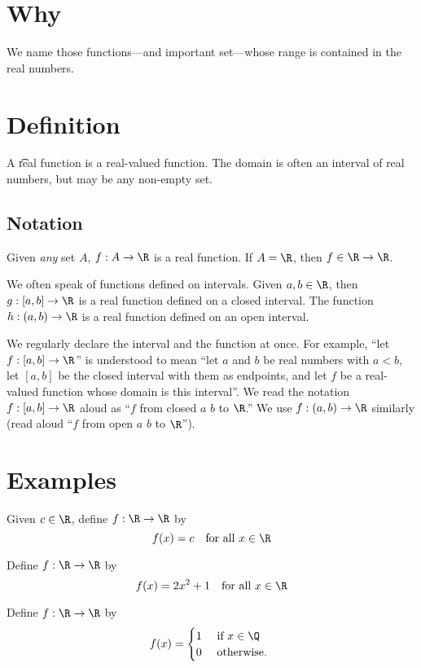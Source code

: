 
\section*{Why}

We name those functions---and important set---whose range is contained in the real numbers.

\section*{Definition}

A \t{real function} is a real-valued function.
The domain is often an interval of real numbers, but may be any non-empty set.

\subsection*{Notation}

Given \textit{any} set $A$, $f: A \to \R $ is a real function.
If $A = \R $, then $f \in \R  \to \R $.

We often speak of functions defined on intervals.
Given $a, b \in \R $, then $g: [a, b] \to \R $ is a real function defined on a closed interval.
The function $h: (a, b) \to \R $ is a real function defined on an open interval.

We regularly declare the interval and the function at once.
For example, ``let $f: [a, b] \to \R $'' is understood to mean ``let $a$ and $b$ be real numbers with $a < b$, let $[a, b]$ be the closed interval with them as endpoints, and let $f$ be a real-valued function whose domain is this interval''.
We read the notation $f: [a, b] \to \R $ aloud as ``$f$ from closed $a$ $b$ to $\R $.''
We use $f: (a, b) \to \R $ similarly (read aloud ``$f$ from open $a$ $b$ to $\R $'').

\section*{Examples}

\begin{example}
Given $c \in \R $, define $f: \R  \to \R $ by
\[
f(x) = c \quad \text{for all } x \in \R
\]
\end{example}

\begin{example}
Define $f: \R  \to \R $ by
\[
f(x) = 2x^2 + 1 \quad \text{for all } x \in \R
\]
\end{example}

\begin{example}
Define $f: \R  \to \R $ by
\[
f(x) = \begin{cases}
1 & \text{ if } x \in \Q  \\
0 & \text{ otherwise. }
\end{cases}
\]
\end{example}

\blankpage